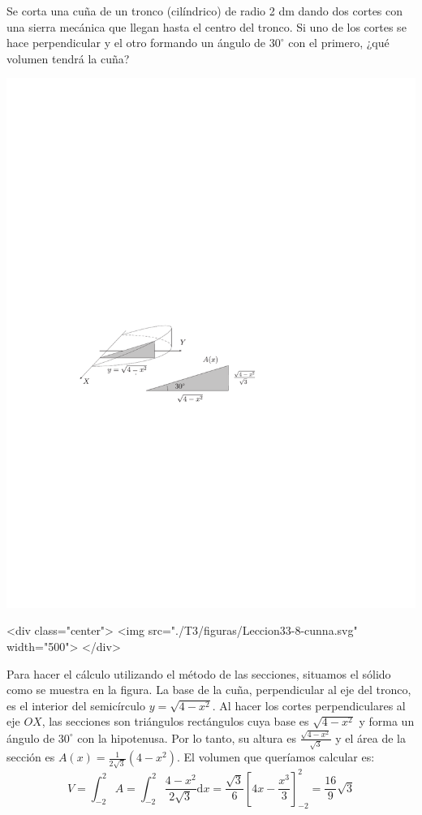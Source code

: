 \begin{ejemplo}\label{ej-cunna}
Se corta una cuña de un tronco (cilíndrico) de radio 2 dm
dando dos cortes con una sierra mecánica que llegan hasta el centro del
tronco. Si uno de los cortes se hace perpendicular y el otro formando un ángulo de
$30^\circ$ con  el primero, ¿qué volumen tendrá la cuña?
\begin{latexonly}
\begin{center}
\includegraphics{T3/figs/cunna.pdf}
\end{center}
\end{latexonly}
\begin{rawhtml}
<div class="center">
<img src="./T3/figuras/Leccion33-8-cunna.svg" width="500">
</div>
\end{rawhtml}
Para hacer el cálculo utilizando el método de las secciones, situamos el sólido como se muestra en la figura. La base de la cuña, perpendicular al eje del tronco, es el interior del semicírculo $y=\sqrt{4-x^2}$.
Al hacer los cortes perpendiculares al eje $OX$, las secciones son triángulos rectángulos cuya base es $\sqrt{4-x^2}$ y forma un ángulo de $30^\circ$ con la hipotenusa.
Por lo tanto, su altura es $\frac{\sqrt{4-x^2}}{\sqrt3}$ y el área de la sección es 
$A(x)=\frac1{2\sqrt3}(4-x^2)$. El volumen que queríamos calcular es:
\begin{equation}
V=\int_{-2}^2 A=\int_{-2}^2 \frac{4-x^2}{2\sqrt3}\mathrm dx
=\dfrac{\sqrt3}6 \left[4x-\dfrac{x^3}3\right]_{-2}^2 = \dfrac{16}9\sqrt3
\tag*{\fej}
\end{equation}
\end{ejemplo}

